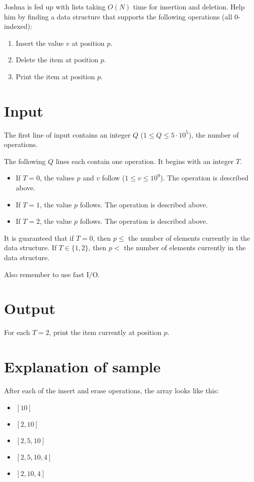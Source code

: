 Joshua is fed up with lists taking $O(N)$ time for insertion and deletion. Help him by finding a data
structure that supports the following operations (all 0-indexed):

\begin{enumerate}
  \item Insert the value $v$ at position $p$.
  \item Delete the item at position $p$.
  \item Print the item at position $p$. 
\end{enumerate}

\section*{Input}
The first line of input contains an integer $Q$ ($1 \leq Q \leq 5 \cdot 10^5$), the number of operations.

The following $Q$ lines each contain one operation. It begins with an integer $T$.
\begin{itemize}
  \item If $T=0$, the values $p$ and $v$ follow ($1 \leq v \leq 10^9$). The operation is described above.
  \item If $T=1$, the value $p$ follows. The operation is described above.
  \item If $T=2$, the value $p$ follows. The operation is described above.
\end{itemize}
It is guaranteed that if $T=0$, then $p \leq$ the number of elements currently in the data structure.
If $T \in \{1, 2\}$, then $p <$ the number of elements currently in the data structure.

Also remember to use fast I/O.

\section*{Output}
For each $T=2$, print the item currently at position $p$.

\section*{Explanation of sample}
After each of the insert and erase operations, the array looks like this:
\begin{itemize}
  \item $[10]$
  \item $[2, 10]$
  \item $[2, 5, 10]$
  \item $[2, 5, 10, 4]$
  \item $[2, 10, 4]$
\end{itemize}
